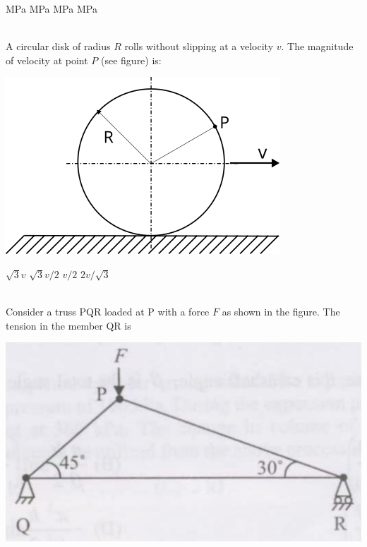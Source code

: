 \documentclass[addpoints,11pt]{exam}
\begin{document}
\begin{questions}
        \begin{oneparchoices}
             MPa
             MPa
             MPa
             MPa
        \end{oneparchoices}\\

        \question A circular disk of radius $R$ rolls without slipping at a velocity $v$. The magnitude of velocity at point $P$ (see figure) is:
        
        \begin{center}
            \includegraphics[scale=0.7]{q33}
        \end{center}

        \begin{oneparchoices}
            \choice $\sqrt{3}v$
            \choice $\sqrt{3}v/2$
            \choice $v/2$
            \choice $2v/\sqrt{3}$
        \end{oneparchoices}\\

        \question Consider a truss PQR loaded at P with a force $F$ as shown in the figure.
        The tension in the member QR is

        \begin{center}
            \includegraphics[scale=0.3]{q34}
        \end{center}


\end{questions}
\end{document}
